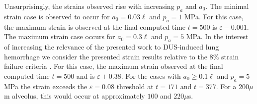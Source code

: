 Unsurprisingly, the strains observed rise with increasing $p_a$ and
$a_0$. The minimal strain case is observed to occur for
$a_0 = 0.03\ell$ and $p_a = 1$ MPa. For this case, the maximum strain
is observed at the final computed time $t = 500$ is
$\varepsilon-0.001$. The maximum strain case occurs for
$a_0 = 0.3\ell$ and $p_a = 5$ MPa. In the interest of increasing the
relevance of the presented work to \ac{DUS}-induced lung hemorrhage we
consider the presented strain results relative to the $8\%$ strain
failure criteria \citep{Vlahakis2000}. For this case, the maximum
strain observed at the final computed time $t = 500$ and is
$\varepsilon+0.38$. For the cases with $a_0 \geq 0.1\ell$ and
$p_a = 5$ MPa the strain exceeds the $\varepsilon=0.08$ threshold at
$t = 171$ and $t = 377$. For a $200 \mu$m alveolus, this would occur
at approximately $100$ and $220 \mu$s.
%

